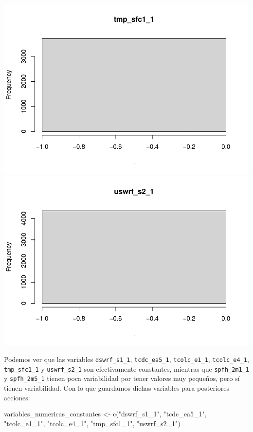 \documentclass[
  11pt,
  a4paper,
]{article}
\newenvironment{Shaded}{\begin{snugshade}}{\end{snugshade}}
\newcommand{\FunctionTok}[1]{\textcolor[rgb]{0.00,0.00,0.00}{#1}}
\newcommand{\NormalTok}[1]{#1}
\newcommand{\OtherTok}[1]{\textcolor[rgb]{0.56,0.35,0.01}{#1}}
\newcommand{\StringTok}[1]{\textcolor[rgb]{0.31,0.60,0.02}{#1}}
\begin{document}
\includegraphics{memoria_practica_1_files/figure-latex/unnamed-chunk-6-7.pdf}
\includegraphics{memoria_practica_1_files/figure-latex/unnamed-chunk-6-8.pdf}

Podemos ver que las variables \texttt{dswrf\_s1\_1},
\texttt{tcdc\_ea5\_1}, \texttt{tcolc\_e1\_1}, \texttt{tcolc\_e4\_1},
\texttt{tmp\_sfc1\_1} y \texttt{uswrf\_s2\_1} son efectivamente
constantes, mientras que \texttt{spfh\_2m1\_1} y \texttt{spfh\_2m5\_1}
tienen poca variabilidad por tener valores muy pequeños, pero sí tienen
variabilidad. Con lo que guardamos dichas variables para posteriores
acciones:

\begin{Shaded}
\begin{Highlighting}[]
\NormalTok{variables\_numericas\_constantes }\OtherTok{\textless{}{-}} \FunctionTok{c}\NormalTok{(}\StringTok{"dswrf\_s1\_1"}\NormalTok{, }\StringTok{"tcdc\_ea5\_1"}\NormalTok{, }\StringTok{"tcolc\_e1\_1"}\NormalTok{, }\StringTok{"tcolc\_e4\_1"}\NormalTok{, }\StringTok{"tmp\_sfc1\_1"}\NormalTok{, }\StringTok{"uswrf\_s2\_1"}\NormalTok{)}
\end{Highlighting}
\end{Shaded}
\end{document}
